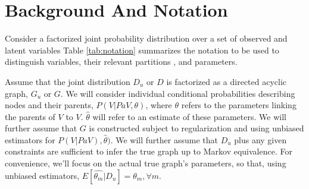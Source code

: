 \documentclass{article}
\begin{document}
\section{Background And Notation}
\label{Background}

Consider a factorized joint probability distribution over a set of observed and latent variables Table \ref{tab:notation} summarizes the notation to be used to distinguish variables, their relevant partitions , and parameters. 


\begin{table}[h]
\centering
{}
\smallskip
\caption{Notation}
\label{tab:notation}
\end{table}

Assume that the joint distribution $D_{u}$ or $D$ is factorized as a directed acyclic graph, $G_{u}$ or $G$.  We will consider individual conditional probabilities describing nodes and their parents, $P(V | Pa{V}, \theta)$, where $\theta$ refers to the parameters linking  the parents of $V$ to $V$.  $\hat{\theta}$ will refer to an estimate of these parameters.  We will further assume that $G$ is constructed subject to regularization and using unbiased estimators for $P(V | Pa{V}), \hat{\theta})$.  We will further assume that $D_u$ plus any given constraints are sufficient to infer the true graph up to Markov equivalence.  For convenience, we'll focus on the actual true graph's parameters, so that, using unbiased estimators, $E[\hat{\theta_m}|D_u] = \theta_m, \forall m$.
\end{document}

